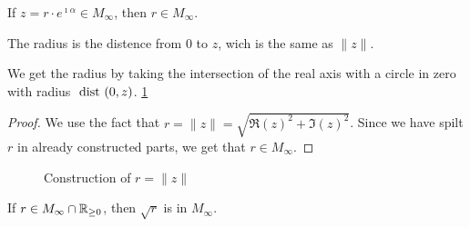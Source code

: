 \begin{lemma}
    \label{lem:construction_radius}
    If $z = r\cdot e^{\imath\alpha} \in M_{\infty}$, then $r \in  M_{\infty}$.
\end{lemma}
\begin{remark}
    The radius is the distence from $0$ to $z$, wich is the same as $\|z\|$.
\end{remark}
We get the radius by taking the intersection of the real axis with a circle in zero with radius $\text{ dist } (0,z)$. \ref{Fig.radius}
\begin{proof}
    We use the fact that $r = \|z\| = \sqrt{\Re(z)^2 + \Im(z)^2}$. Since we have spilt $r$ in already constructed parts, we get that $r \in M_{\infty}$.
\end{proof}

\begin{figure}[h]
    \centering
    \caption{Construction of $r = \|z\|$}
    \label{Fig.radius}
\end{figure}

\begin{lemma}
    \label{lem:pos_real_root}
    If $r \in M_{\infty}\cap\mathbb{R}_{\ge 0}$, then $\sqrt{r}$ is in  $M_{\infty}$.
\end{lemma}

